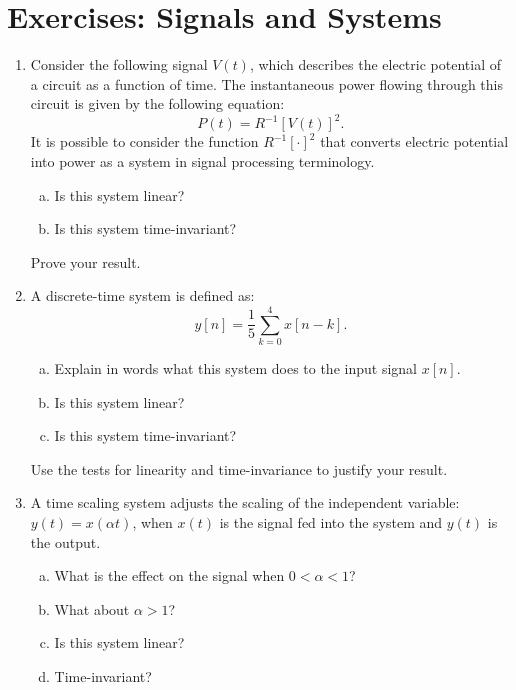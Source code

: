 \newpage
\section{Exercises: Signals and Systems}
\begin{enumerate}

  \item Consider the following signal $V(t)$, which describes the electric potential of a circuit as a function of time.
        The instantaneous power flowing through this circuit is given by the following equation:
        \begin{equation*}
          P(t)=R^{-1}[V(t)]^2.
        \end{equation*}
        It is possible to consider the function $R^{-1}[\cdot]^2$ that converts electric
        potential into power as a system in signal processing terminology.
        \begin{enumerate}[a)]
          \item Is this system linear?
          \item Is this system time-invariant?
        \end{enumerate}
        Prove your result.

  \item A discrete-time system is defined as:
        \begin{equation}
          y[n]= \frac{1}{5}\sum_{k=0}^{4} x[n-k].
        \end{equation}
        \begin{enumerate}[a)]
          \item Explain in words what this system does to the input signal $x[n]$.
          \item Is this system linear?
          \item Is this system time-invariant?
        \end{enumerate}
        Use the tests for linearity and time-invariance to justify your result.

  \item A time scaling system adjusts the scaling of the independent variable: $y(t) = x(\alpha t)$,
        when $x(t)$ is the signal fed into the system and $y(t)$ is the output.

        \begin{enumerate}[a)]
          \item What is the effect on the signal when $0<\alpha<1$?
          \item What about $\alpha>1$?
          \item Is this system linear?
          \item Time-invariant?
        \end{enumerate}


\end{enumerate}
